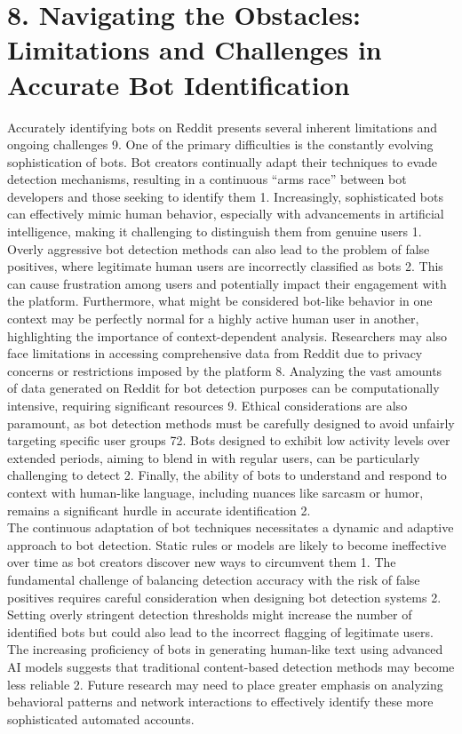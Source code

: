 \documentclass[
  12pt,
  letterpaper,
  DIV=11,
  numbers=noendperiod]{scrartcl}
\begin{document}
\section{\texorpdfstring{\textbf{8. Navigating the Obstacles:
Limitations and Challenges in Accurate Bot
Identification}}{8. Navigating the Obstacles: Limitations and Challenges in Accurate Bot Identification}}\label{navigating-the-obstacles-limitations-and-challenges-in-accurate-bot-identification}

Accurately identifying bots on Reddit presents several inherent
limitations and ongoing challenges 9. One of the primary difficulties is
the constantly evolving sophistication of bots. Bot creators continually
adapt their techniques to evade detection mechanisms, resulting in a
continuous ``arms race'' between bot developers and those seeking to
identify them 1. Increasingly, sophisticated bots can effectively mimic
human behavior, especially with advancements in artificial intelligence,
making it challenging to distinguish them from genuine users 1.\\
Overly aggressive bot detection methods can also lead to the problem of
false positives, where legitimate human users are incorrectly classified
as bots 2. This can cause frustration among users and potentially impact
their engagement with the platform. Furthermore, what might be
considered bot-like behavior in one context may be perfectly normal for
a highly active human user in another, highlighting the importance of
context-dependent analysis. Researchers may also face limitations in
accessing comprehensive data from Reddit due to privacy concerns or
restrictions imposed by the platform 8. Analyzing the vast amounts of
data generated on Reddit for bot detection purposes can be
computationally intensive, requiring significant resources 9. Ethical
considerations are also paramount, as bot detection methods must be
carefully designed to avoid unfairly targeting specific user groups 72.
Bots designed to exhibit low activity levels over extended periods,
aiming to blend in with regular users, can be particularly challenging
to detect 2. Finally, the ability of bots to understand and respond to
context with human-like language, including nuances like sarcasm or
humor, remains a significant hurdle in accurate identification 2.\\
The continuous adaptation of bot techniques necessitates a dynamic and
adaptive approach to bot detection. Static rules or models are likely to
become ineffective over time as bot creators discover new ways to
circumvent them 1. The fundamental challenge of balancing detection
accuracy with the risk of false positives requires careful consideration
when designing bot detection systems 2. Setting overly stringent
detection thresholds might increase the number of identified bots but
could also lead to the incorrect flagging of legitimate users. The
increasing proficiency of bots in generating human-like text using
advanced AI models suggests that traditional content-based detection
methods may become less reliable 2. Future research may need to place
greater emphasis on analyzing behavioral patterns and network
interactions to effectively identify these more sophisticated automated
accounts.
\end{document}
